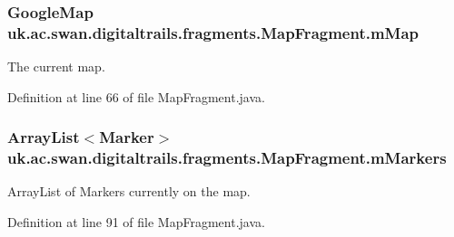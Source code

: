 \hypertarget{classuk_1_1ac_1_1swan_1_1digitaltrails_1_1fragments_1_1_map_fragment_abc99770043e7270d681a55162785a5a4}{
\subsubsection[{m\+Map}]{\setlength{\rightskip}{0pt plus 5cm}Google\+Map uk.\+ac.\+swan.\+digitaltrails.\+fragments.\+Map\+Fragment.\+m\+Map\hspace{0.3cm}{\ttfamily [protected]}}}\label{classuk_1_1ac_1_1swan_1_1digitaltrails_1_1fragments_1_1_map_fragment_abc99770043e7270d681a55162785a5a4}


The current map. 



Definition at line 66 of file Map\+Fragment.\+java.

\hypertarget{classuk_1_1ac_1_1swan_1_1digitaltrails_1_1fragments_1_1_map_fragment_a00d1c005124f882b1b83a6190a6df9b3}{
\subsubsection[{m\+Markers}]{\setlength{\rightskip}{0pt plus 5cm}Array\+List$<$Marker$>$ uk.\+ac.\+swan.\+digitaltrails.\+fragments.\+Map\+Fragment.\+m\+Markers\hspace{0.3cm}{\ttfamily [protected]}}}\label{classuk_1_1ac_1_1swan_1_1digitaltrails_1_1fragments_1_1_map_fragment_a00d1c005124f882b1b83a6190a6df9b3}


Array\+List of Markers currently on the map. 



Definition at line 91 of file Map\+Fragment.\+java.

